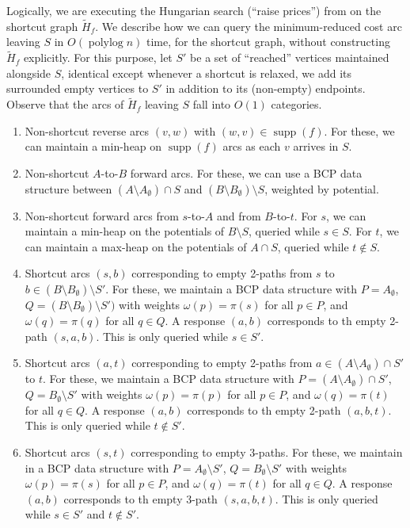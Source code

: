 \documentclass[11pt]{article}
\def\polylog{\mathop{\mathrm{polylog}}}
\def\supp{\operatorname{supp}}
\theoremstyle{plain}
\numberwithin{figure}{section}
\begin{document}
Logically, we are executing the Hungarian search (``raise prices'') from
\cite[Section 3.2]{GHKT17} on the shortcut graph $\tilde{H}_f$.
We describe how we can query the minimum-reduced cost arc leaving $S$ in
$O(\polylog n)$ time, for the shortcut graph, without constructing
$\tilde{H}_f$ explicitly.
For this purpose, let $S'$ be a set of ``reached'' vertices maintained
alongside $S$, identical except whenever a shortcut is relaxed, we add its
surrounded empty vertices to $S'$ in addition to its (non-empty) endpoints.
Observe that the arcs of $\tilde{H}_f$ leaving $S$ fall into $O(1)$ categories.
\begin{enumerate}
\item Non-shortcut reverse arcs $(v, w)$ with $(w, v) \in \supp(f)$.
	For these, we can maintain a min-heap on $\supp(f)$ arcs as each $v$
	arrives in $S$.
\item Non-shortcut $A$-to-$B$ forward arcs.
	For these, we can use a BCP data structure between
	$(A \setminus A_\emptyset) \cap S$ and
	$(B \setminus B_\emptyset) \setminus S$, weighted by potential.
\item Non-shortcut forward arcs from $s$-to-$A$ and from $B$-to-$t$.
	For $s$, we can maintain a min-heap on the potentials of
	$B \setminus S$, queried while $s \in S$.
	For $t$, we can maintain a max-heap on the potentials of
	$A \cap S$, queried while $t \not\in S$.

\item Shortcut arcs $(s, b)$ corresponding to empty 2-paths from $s$ to
	$b \in (B \setminus B_\emptyset) \setminus S'$.
	For these, we maintain a BCP data structure with $P = A_\emptyset$,
	$Q = (B \setminus B_\emptyset) \setminus S')$ with weights
	$\omega(p) = \pi(s)$ for all $p \in P$, and $\omega(q) = \pi(q)$ for
	all $q \in Q$.
	A response $(a, b)$ corresponds to th empty 2-path $(s, a, b)$.
	This is only queried while $s \in S'$.
\item Shortcut arcs $(a, t)$ corresponding to empty 2-paths from
	$a \in (A \setminus A_\emptyset) \cap S'$ to $t$.
	For these, we maintain a BCP data structure with
	$P = (A \setminus A_\emptyset) \cap S'$,
	$Q = B_\emptyset \setminus S'$ with weights $\omega(p) = \pi(p)$ for
	all $p \in P$, and $\omega(q) = \pi(t)$ for all $q \in Q$.
	A response $(a, b)$ corresponds to th empty 2-path $(a, b, t)$.
	This is only queried while $t \not\in S'$.
\item Shortcut arcs $(s, t)$ corresponding to empty 3-paths.
	For these, we maintain in a BCP data structure with
	$P = A_\emptyset \setminus S'$, $Q = B_\emptyset \setminus S'$ with
	weights $\omega(p) = \pi(s)$ for all
	$p \in P$, and $\omega(q) = \pi(t)$ for all $q \in Q$.
	A response $(a, b)$ corresponds to th empty 3-path $(s, a, b, t)$.
	This is only queried while $s \in S'$ and $t \not\in S'$.
\end{enumerate}
\end{document}

